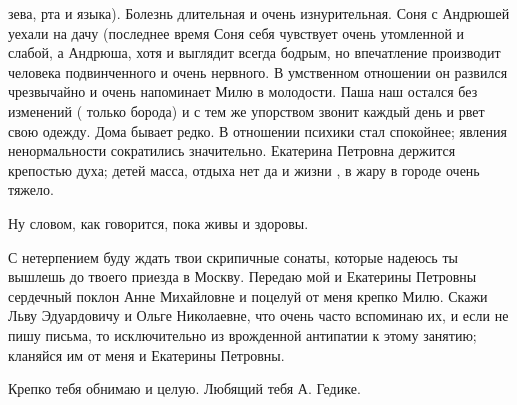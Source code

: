 
\noindent
зева, рта и языка). Болезнь длительная и очень изнурительная. Соня с Андрюшей
уехали на дачу (последнее время Соня себя чувствует очень утомленной и слабой,
а Андрюша, хотя и выглядит всегда бодрым, но впечатление производит человека
подвинченного и очень нервного. В умственном отношении он развился чрезвычайно
и очень напоминает Милю в молодости. Паша наш остался без изменений (
только борода) и с тем же упорством звонит каждый день и рвет свою одежду. Дома
бывает редко. В отношении психики стал спокойнее; явления ненормальности
сократились значительно. Екатерина Петровна держится крепостью духа; детей
масса, отдыха нет да и жизни , в жару в городе очень тяжело.


Ну словом, как говорится, пока живы и здоровы.

С нетерпением буду ждать твои скрипичные сонаты, которые надеюсь ты вышлешь до
твоего приезда в Москву. Передаю мой и Екатерины Петровны сердечный поклон Анне
Михайловне и поцелуй от меня крепко Милю. Скажи Льву Эдуардовичу и Ольге
Николаевне, что очень часто вспоминаю их, и если не пишу письма, то
исключительно из врожденной антипатии к этому занятию; кланяйся им от меня и
Екатерины Петровны.

Крепко тебя обнимаю и целую. Любящий тебя А. Гедике.
